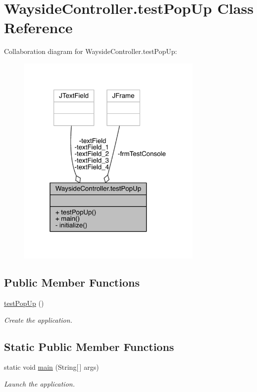 \hypertarget{classWaysideController_1_1testPopUp}{}\section{Wayside\+Controller.\+test\+Pop\+Up Class Reference}
\label{classWaysideController_1_1testPopUp}


Collaboration diagram for Wayside\+Controller.\+test\+Pop\+Up\+:
\nopagebreak
\begin{figure}[H]
\begin{center}
\leavevmode
\includegraphics[width=256pt]{classWaysideController_1_1testPopUp__coll__graph}
\end{center}
\end{figure}
\subsection*{Public Member Functions}
\begin{DoxyCompactItemize}
\item 
\hyperlink{classWaysideController_1_1testPopUp_aca786bae3886bcc67ee27de840713e80}{test\+Pop\+Up} ()
\begin{DoxyCompactList}\small\item\em Create the application. \end{DoxyCompactList}\end{DoxyCompactItemize}
\subsection*{Static Public Member Functions}
\begin{DoxyCompactItemize}
\item 
static void \hyperlink{classWaysideController_1_1testPopUp_ac54f2c2c1dbe5aa8a76375e714641124}{main} (String\mbox{[}$\,$\mbox{]} args)
\begin{DoxyCompactList}\small\item\em Launch the application. \end{DoxyCompactList}\end{DoxyCompactItemize}
